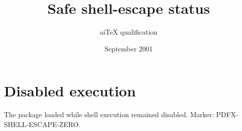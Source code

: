 \documentclass{article}
\title{Safe shell-escape status}
\author{aiTeX qualification}
\date{September 2001}
\begin{document}
\maketitle
\section{Disabled execution}
The package loaded while shell execution remained disabled. Marker:
PDFX-SHELL-ESCAPE-ZERO.
\end{document}
